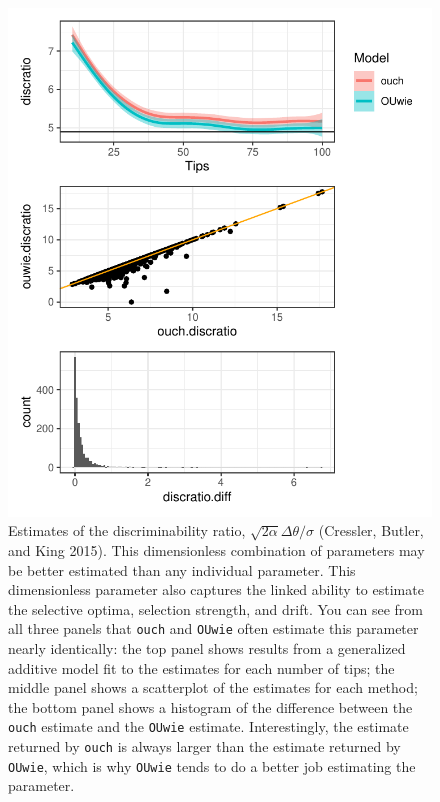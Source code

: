 \documentclass[12pt,reqno,final]{amsart}\usepackage[]{graphicx}\usepackage[]{color}
\makeatletter
\def\maxwidth{ %
  \ifdim\Gin@nat@width>\linewidth
    \linewidth
  \else
    \Gin@nat@width
  \fi
}
\newenvironment{kframe}{%
 \def\at@end@of@kframe{}%
 \ifinner\ifhmode%
  \def\at@end@of@kframe{\end{minipage}}%
  \begin{minipage}{\columnwidth}%
 \fi\fi%
 \def\FrameCommand##1{\hskip\@totalleftmargin \hskip-\fboxsep
 \colorbox{shadecolor}{##1}\hskip-\fboxsep
     \hskip-\linewidth \hskip-\@totalleftmargin \hskip\columnwidth}%
 \MakeFramed {\advance\hsize-\width
   \@totalleftmargin\z@ \linewidth\hsize
   \@setminipage}}%
 {\par\unskip\endMakeFramed%
 \at@end@of@kframe}
\newenvironment{knitrout}{}{} %
\theoremstyle{plain}
\numberwithin{equation}{part}
\makeatother
\begin{document}
\begin{knitrout}
\color{fgcolor}\begin{kframe}


{\ttfamily\noindent\itshape{}}\end{kframe}\begin{figure}
\includegraphics[width=\maxwidth]{figure/unnamed-chunk-2-1} \caption{Estimates of the discriminability ratio, $\sqrt{2\alpha}\Delta\theta/\sigma$ (Cressler, Butler, and King 2015). This dimensionless combination of parameters may be better estimated than any individual parameter. This dimensionless parameter also captures the linked ability to estimate the selective optima, selection strength, and drift. You can see from all three panels that \texttt{ouch} and \texttt{OUwie} often estimate this parameter nearly identically: the top panel shows results from a generalized additive model fit to the estimates for each number of tips; the middle panel shows a scatterplot of the estimates for each method; the bottom panel shows a histogram of the difference between the \texttt{ouch} estimate and the \texttt{OUwie} estimate. Interestingly, the estimate returned by \texttt{ouch} is always larger than the estimate returned by \texttt{OUwie}, which is why \texttt{OUwie} tends to do a better job estimating the parameter.}\label{fig:unnamed-chunk-2}
\end{figure}


\end{knitrout}
\end{document}
